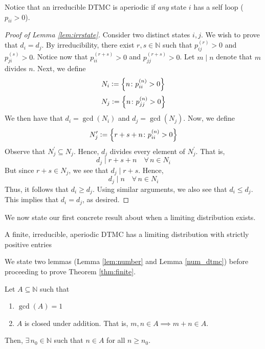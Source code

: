 \documentclass[12pt]{article}
\theoremstyle{definition}
\begin{document}
Notice that an irreducible DTMC is aperiodic if \emph{any} state $i$ has a self loop ($p_{ii} > 0$).

\begin{proof}[Proof of Lemma \ref{lem:irrstate}]
    Consider two distinct states $i,j$. We wish to prove that $d_i = d_j$. By irreducibility, there exist $r, s \in \mathbb{N}$ such that $p_{ij}^{(r)} > 0$ and $p_{ji}^{(s)} > 0$. Notice now that $p_{ii}^{(r+s)} > 0$ and $p_{jj}^{(r+s)} > 0$. Let $m \mid n$ denote that $m$ divides $n$. Next, we define
    \[
        N_i \vcentcolon= \left\{ n \colon p_{ii}^{(n)} > 0 \right\}
    \]
    \[
        N_j \vcentcolon= \left\{ n \colon p_{jj}^{(n)} > 0 \right\}
    \]
    We then have that $d_i = \gcd(N_i)$ and $d_j = \gcd(N_j)$. Now, we define
    \[
        N_j^{\prime} \vcentcolon= \left\{ r+s+n \colon p_{ii}^{(n)} > 0 \right\}
    \]
    Observe that $N_j^{\prime} \subseteq N_j$. Hence, $d_j$ divides every element of $N_j^{\prime}$. That is,
    \[
        d_j \mid r+s+n \quad \forall \, n \in N_i
    \]
    But since $r+s \in N_j$, we see that $d_j \mid r+s$. Hence, 
    \[
        d_j \mid n \quad \forall \, n \in N_i
    \]
    Thus, it follows that $d_i \geq d_j$. Using similar arguments, we also see that $d_i \leq d_j$. This implies that $d_i = d_j$, as desired.
\end{proof}

We now state our first concrete result about when a limiting distribution exists. 

\begin{thm} \label{thm:finite}
    A finite, irreducible, aperiodic DTMC has a limiting distribution with strictly positive entries
\end{thm}

We state two lemmas (Lemma \ref{lem:number} and Lemma \ref{num_dtmc}) before proceeding to prove Theorem \ref{thm:finite}. 

\begin{lem} \label{lem:number}
    Let $A \subseteq \mathbb{N}$ such that 
    \begin{enumerate}
        \item $\gcd(A) = 1$
        \item $A$ is closed under addition. That is, $m, n \in A \implies m+n \in A$.
    \end{enumerate}
    
    Then, $\exists \, n_0 \in \mathbb{N}$ such that $n \in A$ for all $n \geq n_0$.
\end{lem}
\end{document}
